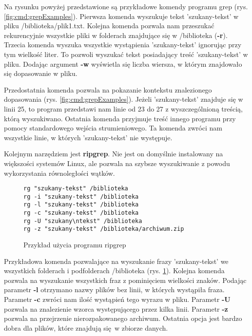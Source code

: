 Na rysunku powyżej przedstawione są przykładowe komendy programu grep 
(rys. \ref{fig:cmd:grepExamples}). Pierwsza komenda wyszukuje tekst 'szukany-tekst' w pliku /biblioteka/plik1.txt.
Kolejna komenda pozwala nam przeszukać rekurencyjnie wszystkie pliki w folderach znajdujące się w 
/biblioteka (\textbf{-r}). Trzecia komenda wyszuka wszystkie wystąpienia 
'szukany-tekst' ignorując przy tym wielkość liter. To pozwoli wyszukać tekst
posiadający treść 'szukany-tekst' w pliku. Dodając argument \textbf{-w}
wyświetla się liczba wiersza, w którym znajdowało się dopasowanie w pliku. 

Przedostatnia komenda pozwala na pokazanie kontekstu znalezionego dopasowania 
(rys. \ref{fig:cmd:grepExamples}). Jeżeli 'szukany-tekst' znajduje się w linii 25, to
program przedstawi nam linie od 23 do 27 z wyszczególnioną treścią, którą 
wyszukiwano. Ostatnia komenda przyjmuje treść innego programu przy pomocy
standardowego wejścia strumieniowego. Ta komenda zwróci nam wszystkie linie,
w których 'szukany-tekst' nie występuje.

Kolejnym narzędziem jest \textbf{ripgrep}. Nie jest on domyślnie instalowany na 
większości systemów Linux, ale pozwala na szybsze wyszukiwanie z powodu
wykorzystania równoległości wątków.

\begin{figure}[htbp]
  \centering
\begin{tcolorbox}[
    colback=white,
    colframe=black,
    boxrule=0.5pt,
    arc=0pt
]
  \begin{verbatim}
rg "szukany-tekst" /biblioteka
rg -i "szukany-tekst" /biblioteka
rg -l "szukany-tekst" /biblioteka
rg -c "szukany-tekst" /biblioteka
rg -U "szukany\ntekst" /biblioteka
rg -z "szukany-tekst" /biblioteka/archiwum.zip
  \end{verbatim}
\end{tcolorbox}
\caption{Przykład użycia programu ripgrep}
\label{fig:cmd:ripgrepExamples}
\end{figure}

Przykładowa komenda pozwalające na wyszukanie frazy 'szukany-tekst' we wszystkich
folderach i podfolderach /biblioteka (rys. \ref{fig:cmd:ripgrepExamples}). Kolejna
komenda pozwala na wyszukanie wszystkich fraz z pominięciem wielkości znaków. 
Podając parametr \textbf{-l} otrzymano nazwy plików bez linii, w których 
wystąpiła fraza. Parametr \textbf{-c} zwróci nam ilość wystąpień tego wyrazu w 
pliku. Parametr \textbf{-U} pozwala na znalezienie wzorca występującego przez 
kilka linii. Parametr \textbf{-z} pozwala na przejrzenie nierozpakowanego 
archiwum. Ostatnia opcja jest bardzo dobra dla plików, które znajdują się w 
zbiorze danych.

